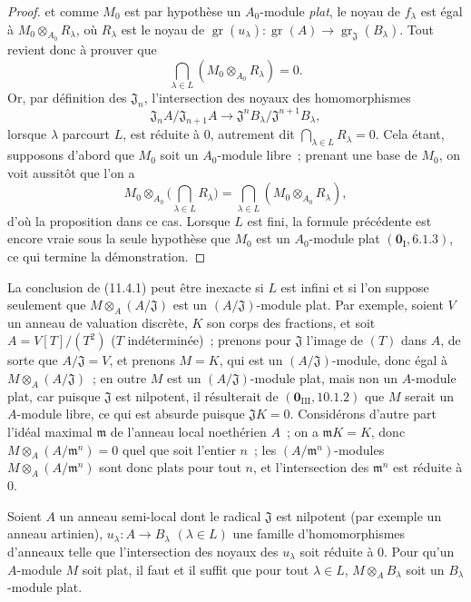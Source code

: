 \begin{proof}

et comme $M_0$ est par hypothèse un $A_0$-module \emph{plat}, le noyau de
$f_\lambda$ est égal à $M_0\otimes_{A_0}R_\lambda$, où $R_\lambda$ est le
noyau de
$\operatorname{gr}(u_\lambda):\operatorname{gr}(A)
\to\operatorname{gr}_{\mathfrak J}(B_\lambda)$. Tout revient donc à prouver
que
\[
\bigcap_{\lambda\in L}(M_0\otimes_{A_0}R_\lambda)=0.
\]
Or, par définition des $\mathfrak J_n$, l'intersection des noyaux des
homomorphismes
\[
\mathfrak J_nA/\mathfrak J_{n+1}A
\longrightarrow\mathfrak J^nB_\lambda/\mathfrak J^{n+1}B_\lambda,
\]
lorsque $\lambda$ parcourt $L$, est réduite à $0$, autrement dit
$\bigcap_{\lambda\in L}R_\lambda=0$. Cela étant, supposons d'abord que $M_0$
soit un $A_0$-module libre~; prenant une base de $M_0$, on voit aussitôt que
l'on a
\[
M_0\otimes_{A_0}\Big(\bigcap_{\lambda\in L}R_\lambda\Big)
=\bigcap_{\lambda\in L}(M_0\otimes_{A_0}R_\lambda),
\]
d'où la proposition dans ce cas. Lorsque $L$ est fini, la formule précédente
est encore vraie sous la seule hypothèse que $M_0$ est un $A_0$-module plat
$(\mathbf 0_{\mathrm I},6.1.3)$, ce qui termine la démonstration.
\end{proof}

\begin{remark}[11.4.2]
\label{IV.11.4.2-fr}
La conclusion de (11.4.1) peut être inexacte si $L$ est infini et si l'on
suppose seulement que $M\otimes_A(A/\mathfrak J)$ est un
$(A/\mathfrak J)$-module plat. Par exemple, soient $V$ un anneau de valuation
discrète, $K$ son corps des fractions, et soit $A=V[T]/(T^2)$ ($T$
indéterminée)~; prenons pour $\mathfrak J$ l'image de $(T)$ dans $A$, de sorte
que $A/\mathfrak J=V$, et prenons $M=K$, qui est un
$(A/\mathfrak J)$-module, donc égal à $M\otimes_A(A/\mathfrak J)$~; en outre
$M$ est un $(A/\mathfrak J)$-module plat, mais non un $A$-module plat, car
puisque $\mathfrak J$ est nilpotent, il résulterait de
$(\mathbf 0_{\mathrm{III}},10.1.2)$ que $M$ serait un $A$-module libre, ce qui
est absurde puisque $\mathfrak JK=0$. Considérons d'autre part l'idéal maximal
$\mathfrak m$ de l'anneau local noethérien $A$~; on a $\mathfrak mK=K$, donc
$M\otimes_A(A/\mathfrak m^n)=0$ quel que soit l'entier $n$~; les
$(A/\mathfrak m^n)$-modules $M\otimes_A(A/\mathfrak m^n)$ sont donc plats pour
tout $n$, et l'intersection des $\mathfrak m^n$ est réduite à $0$.
\end{remark}

\begin{corollary}[11.4.3]
\label{IV.11.4.3-fr}
Soient $A$ un anneau semi-local dont le radical $\mathfrak J$ est nilpotent
(par exemple un anneau artinien), $u_\lambda:A\to B_\lambda$ $(\lambda\in L)$
une famille d'homomorphismes d'anneaux telle que l'intersection des noyaux des
$u_\lambda$ soit réduite à $0$. Pour qu'un $A$-module $M$ soit plat, il faut et
il suffit que pour tout $\lambda\in L$, $M\otimes_A B_\lambda$ soit un
$B_\lambda$-module plat.
\end{corollary}

